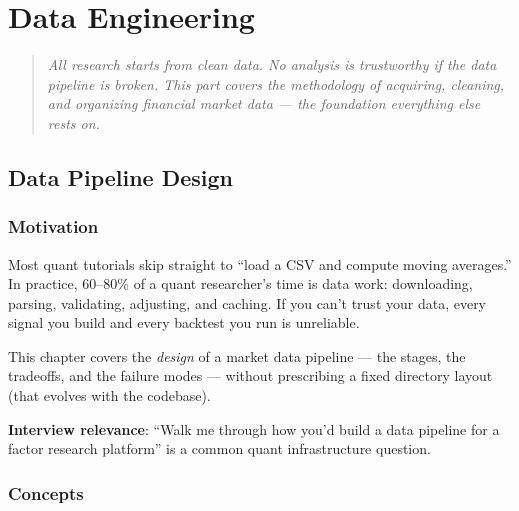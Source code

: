 \documentclass[a4paper, 11pt]{report}
\theoremstyle{definition}
\theoremstyle{remark}
\begin{document}
\tableofcontents



\part{Data Engineering}
\label{part:data}

\begin{quote}
\itshape
All research starts from clean data.  No analysis is trustworthy if the data
pipeline is broken.  This part covers the methodology of acquiring, cleaning, and
organizing financial market data --- the foundation everything else rests on.
\end{quote}


\chapter{Data Pipeline Design}
\label{ch:pipeline}

\section{Motivation}

Most quant tutorials skip straight to ``load a CSV and compute moving averages.''
In practice, 60--80\% of a quant researcher's time is data work: downloading,
parsing, validating, adjusting, and caching.  If you can't trust your data, every
signal you build and every backtest you run is unreliable.

This chapter covers the \emph{design} of a market data pipeline --- the stages,
the tradeoffs, and the failure modes --- without prescribing a fixed directory
layout (that evolves with the codebase).

\textbf{Interview relevance}: ``Walk me through how you'd build a data pipeline
for a factor research platform'' is a common quant infrastructure question.

\section{Concepts}
\end{document}
